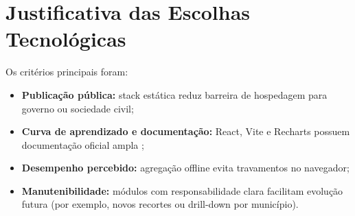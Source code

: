 \section{Justificativa das Escolhas Tecnológicas}

Os critérios principais foram:

\begin{itemize}
	\item \textbf{Publicação pública:} stack estática reduz barreira de hospedagem para governo ou sociedade civil;
	\item \textbf{Curva de aprendizado e documentação:} React, Vite e Recharts possuem documentação oficial ampla \cite{react_docs,vite_docs,recharts_docs};
	\item \textbf{Desempenho percebido:} agregação offline evita travamentos no navegador;
	\item \textbf{Manutenibilidade:} módulos com responsabilidade clara facilitam evolução futura (por exemplo, novos recortes ou drill-down por município).
\end{itemize}

